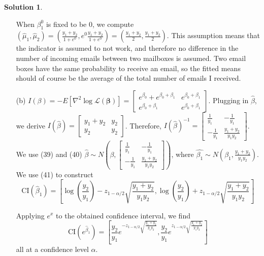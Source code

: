 \documentclass[11pt,letterpaper,english,oneside]{article}\usepackage[]{graphicx}\usepackage[]{color}
\theoremstyle{definition} %
\newtheorem{solution}{Solution}
\newenvironment{sol}{\begin{solution}\hspace{0pt}}{\end{solution}}
\begin{document}
\begin{sol}
\begin{enumerate}
    When $\beta_1^0$ is fixed to be 0, we compute $(\hat{\mu}_1, \hat{\mu}_2) = (\frac{y_1+y_2}{1+e^{0}}, e^{0}\frac{y_1+y_2}{1+e^{0}})=(\frac{y_1+y_2}{2}, \frac{y_1+y_2}{2})$. This assumption means that the indicator is assumed to not work, and therefore no difference in the number of incoming emails between two mailboxes is assumed. Two email boxes have the same probability to receive an email, so the fitted means should of course be the average of the total number of emails I received.
    \item[(b)]
    $I(\beta) = -E[\nabla^2 \log \mathcal L(\bm \beta)] =
    \begin{bmatrix}
    e^{\beta_0}+ e^{\beta_0+\beta_1} &  e^{\beta_0+\beta_1}\\
     e^{\beta_0+\beta_1} &  e^{\beta_0+\beta_1}
    \end{bmatrix}$. Plugging in $\hat{\beta}$, we derive $I(\hat{\beta}) =
    \begin{bmatrix}
    y_1+ y_2 &  y_2\\
     y_2 &  y_2
    \end{bmatrix}$. Therefore, $I(\hat{\beta})^{-1} = \begin{bmatrix}
    \frac{1}{y_1}&  -\frac{1}{y_1}\\
    - \frac{1}{y_1} &  \frac{y_1+y_2}{y_1y_2}
    \end{bmatrix}$. We use (39) and (40) $\hat{\beta} \sim N(\beta, \begin{bmatrix}
    \frac{1}{y_1}&  -\frac{1}{y_1}\\
    - \frac{1}{y_1} &  \frac{y_1+y_2}{y_1y_2}
    \end{bmatrix})$, where $\hat{\beta_1} \sim N(\beta_1,  \frac{y_1+y_2}{y_1y_2})$. We use (41) to construct \\
    $$\text{CI}(\hat{\beta}_1) = \left[\log(\frac{y_2}{y_1})- z_{1-\alpha/2}\sqrt{\frac{y_1+y_2}{y_1y_2}} ,\log(\frac{y_2}{y_1})+z_{1-\alpha/2}\sqrt{\frac{y_1+y_2}{y_1y_2}}\right] $$
    
    Applying $e^x$ to the obtained confidence interval, we find \\
    $$\text{CI}(e^{\hat{\beta}_1}) = \left[\frac{y_2}{y_1}e^{-z_{1-\alpha/2}\sqrt{\frac{y_1+y_2}{y_1y_2}}}, \frac{y_2}{y_1} e^{z_{1-\alpha/2}\sqrt{\frac{y_1+y_2}{y_1y_2}}} \right]$$
    all at a confidence level $\alpha$.
    

\end{enumerate}
\end{sol}
\end{document}
